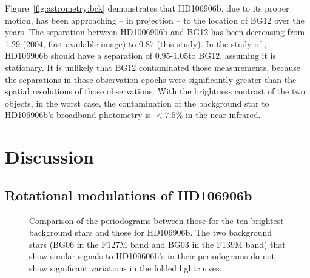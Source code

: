\documentclass[twocolumn, trackchanges]{aastex62}
\begin{document}
Figure~\ref{fig:astrometry:bck} demonstrates that HD106906b, due to its proper motion, has been approaching  -- in projection -- to {the location of BG12}  over the years. The separation between HD1006906b and {BG12} has been decreasing from 1\arcsec.29 (2004, first available image) to 0\arcsec.87 (this study). In the study of \citep{Bailey2013, Wu2016, Daemgen2017},  HD106906b should have a separation of 0.95\arcsec{}-1.05\arcsec to {BG12}, assuming it is stationary. It is unlikely that {BG12} contaminated those measurements, because the separations in those observation epochs were significantly greater than the spatial resolutions of those observations. With the brightness contrast of the two objects, in the worst case, the contamination of the background star to HD106906b's broadband photometry is  $<7.5\%$ in the near-infrared. 








\section{Discussion}
\subsection{Rotational modulations of HD106906b}

\begin{figure}[!t]
  \centering
  \caption{Comparison of the periodograms between those for the ten brightest background stars and those for HD106906b. The two background stars (BG06 in the F127M band and BG03 in the F139M band) that show similar signals to HD109606b's in their periodograms do not show significant variations in the folded lightcurves.}
  \label{fig:all-periodograms}
\end{figure}
\end{document}

